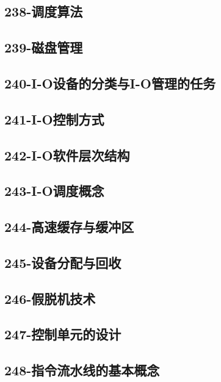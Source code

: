 \subsection{238-调度算法}

\subsection{239-磁盘管理}

\subsection{240-I-O设备的分类与I-O管理的任务}

\subsection{241-I-O控制方式}

\subsection{242-I-O软件层次结构}

\subsection{243-I-O调度概念}

\subsection{244-高速缓存与缓冲区}

\subsection{245-设备分配与回收}

\subsection{246-假脱机技术}

\subsection{247-控制单元的设计}

\subsection{248-指令流水线的基本概念}

